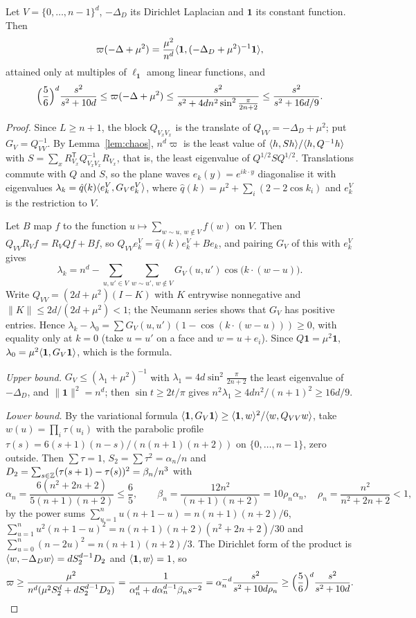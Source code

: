 \begin{theorem}\label{thm:free}
Let $V=\{0,\dots,n-1\}^d$, $-\Delta_D$ its Dirichlet Laplacian and $\mathbf 1$ its
constant function. Then
\[
\varpi(-\Delta+\mu^2)=\frac{\mu^2}{n^d}\langle \mathbf 1,(-\Delta_D+\mu^2)^{-1}\mathbf 1\rangle,
\]
attained only at multiples of $\ell_{\mathbf 1}$ among linear functions, and
\[
\Bigl(\frac56\Bigr)^d\frac{s^2}{s^2+10d}\le\varpi(-\Delta+\mu^2)\le\frac{s^2}
{s^2+4dn^2\sin^2\frac\pi{2n+2}}\le\frac{s^2}{s^2+16d/9}.
\]
\end{theorem}

\begin{proof}
Since $L\ge n+1$, the block $Q_{V_xV_x}$ is the translate of $Q_{VV}=-\Delta_D+
\mu^2$; put $G_V=Q_{VV}^{-1}$. By Lemma~\ref{lem:chaos}, $n^d\varpi$ is the least
value of $\langle h,Sh\rangle/\langle h,Q^{-1}h\rangle$ with $S=\sum_xR_{V_x}^{\mathsf T}Q_{V_xV_x}^{-1}
R_{V_x}$, that is, the least eigenvalue of $Q^{1/2}SQ^{1/2}$. Translations commute
with $Q$ and $S$, so the plane waves $e_k(y)=e^{ik\cdot y}$ diagonalise it with
eigenvalues $\lambda_k=\hat q(k)\langle e_k^V,G_Ve_k^V\rangle$, where $\hat q(k)=\mu^2+
\sum_i(2-2\cos k_i)$ and $e_k^V$ is the restriction to $V$.

Let $B$ map $f$ to the function $u\mapsto\sum_{w\sim u,\,w\notin V}f(w)$ on $V$.
Then $Q_{VV}R_Vf=R_VQf+Bf$, so $Q_{VV}e_k^V=\hat q(k)e_k^V+Be_k$, and pairing
$G_V$ of this with $e_k^V$ gives
\[
\lambda_k=n^d-\sum_{u,u'\in V}\sum_{w\sim u',\,w\notin V}G_V(u,u')\cos\bigl(k\cdot
(w-u)\bigr).
\]
Write $Q_{VV}=(2d+\mu^2)(I-K)$ with $K$ entrywise nonnegative and $\|K\|\le
2d/(2d+\mu^2)<1$; the Neumann series shows that $G_V$ has positive entries.
Hence $\lambda_k-\lambda_0=\sum G_V(u,u')(1-\cos(k\cdot(w-u)))\ge0$, with equality only
at $k=0$ (take $u=u'$ on a face and $w=u+e_i$). Since $Q\mathbf 1=\mu^2\mathbf 1$,
$\lambda_0=\mu^2\langle \mathbf 1,G_V\mathbf 1\rangle$, which is the formula.

\emph{Upper bound.} $G_V\le(\lambda_1+\mu^2)^{-1}$ with $\lambda_1=4d\sin^2\frac\pi
{2n+2}$ the least eigenvalue of $-\Delta_D$, and $\|\mathbf 1\|^2=n^d$; then
$\sin t\ge2t/\pi$ gives $n^2\lambda_1\ge4dn^2/(n+1)^2\ge16d/9$.

\emph{Lower bound.} By the variational formula $\langle \mathbf 1,G_V\mathbf 1\rangle\ge
\langle \mathbf 1,w\rangle^2/\langle w,Q_{VV}w\rangle$, take $w(u)=\prod_i\tau(u_i)$ with the parabolic
profile $\tau(s)=6(s+1)(n-s)/(n(n+1)(n+2))$ on $\{0,\dots,n-1\}$, zero
outside. Then $\sum\tau=1$, $S_2=\sum\tau^2=\alpha_n/n$ and $D_2=\sum_{s\in\mathbb{Z}}
(\tau(s+1)-\tau(s))^2=\beta_n/n^3$ with
\[
\alpha_n=\frac{6(n^2+2n+2)}{5(n+1)(n+2)}\le\frac65,\qquad
\beta_n=\frac{12n^2}{(n+1)(n+2)}=10\rho_n\alpha_n,\quad
\rho_n=\frac{n^2}{n^2+2n+2}<1,
\]
by the power sums $\sum_{u=1}^nu(n+1-u)=n(n+1)(n+2)/6$, $\sum_{u=1}^nu^2(n+1-u)^2=
n(n+1)(n+2)(n^2+2n+2)/30$ and $\sum_{u=0}^n(n-2u)^2=n(n+1)(n+2)/3$. The Dirichlet
form of the product is $\langle w,-\Delta_Dw\rangle=dS_2^{d-1}D_2$ and $\langle \mathbf 1,w\rangle=1$, so
\[
\varpi\ge\frac{\mu^2}{n^d(\mu^2S_2^d+dS_2^{d-1}D_2)}=\frac1{\alpha_n^d+d\alpha_n^{d-1}
\beta_ns^{-2}}=\alpha_n^{-d}\frac{s^2}{s^2+10d\rho_n}\ge\Bigl(\frac56\Bigr)^d
\frac{s^2}{s^2+10d}.\qedhere
\]
\end{proof}

